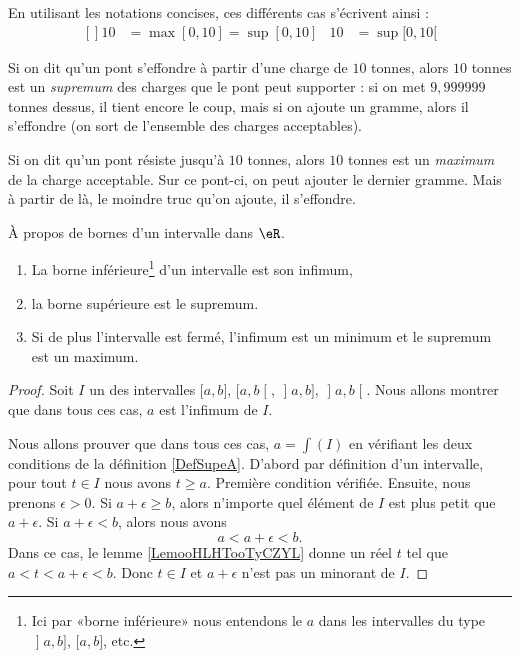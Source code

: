 En utilisant les notations concises, ces différents cas s'écrivent ainsi :
\begin{equation}
	\begin{aligned}[]
		10 & =\max[0,10]=\sup[0,10] & 10 & =\sup[0,10[
	\end{aligned}
\end{equation}


\begin{example}
	Si on dit qu'un pont s'effondre à partir d'une charge de \( 10\) tonnes, alors \( 10\) tonnes est un \emph{supremum} des charges que le pont peut supporter : si on met \( 9,999999\) tonnes dessus, il tient encore le coup, mais si on ajoute un gramme, alors il s'effondre (on sort de l'ensemble des charges acceptables).
\end{example}

\begin{example}
	Si on dit qu'un pont résiste jusqu'à \( 10\) tonnes, alors \( 10\) tonnes est un \emph{maximum} de la charge acceptable. Sur ce pont-ci, on peut ajouter le dernier gramme. Mais à partir de là, le moindre truc qu'on ajoute, il s'effondre.
\end{example}

\begin{lemma}       \label{LEMooWCUXooFqTwDK}
	À propos de bornes d'un intervalle dans \( \eR\).
	\begin{enumerate}
		\item
		      La borne inférieure\footnote{Ici par «borne inférieure» nous entendons le \( a\) dans les intervalles du type \( \mathopen] a , b \mathclose] \), \( \mathopen[ a , b \mathclose]\), etc.} d'un intervalle est son infimum,
		\item
		      la borne supérieure est le supremum.
		\item
		      Si de plus l'intervalle est fermé, l'infimum est un minimum et le supremum est un maximum.
	\end{enumerate}
\end{lemma}

\begin{proof}
	Soit \( I\) un des intervalles \( \mathopen[ a , b \mathclose]\), \( \mathopen[ a , b \mathclose[\), \( \mathopen] a , b \mathclose]\), \( \mathopen] a , b \mathclose[\). Nous allons montrer que dans tous ces cas, \( a\) est l'infimum de \( I\).

	Nous allons prouver que dans tous ces cas, \( a=\int(I)\) en vérifiant les deux conditions de la définition \ref{DefSupeA}. D'abord par définition d'un intervalle, pour tout \( t\in I\) nous avons \( t\geq a\). Première condition vérifiée. Ensuite, nous prenons \( \epsilon>0\). Si \( a+\epsilon\geq b\), alors n'importe quel élément de \( I\) est plus petit que \( a+\epsilon\). Si \( a+\epsilon<b\), alors nous avons
	\begin{equation}
		a<a+\epsilon<b.
	\end{equation}
	Dans ce cas, le lemme \ref{LemooHLHTooTyCZYL} donne un réel \( t\) tel que \( a<t<a+\epsilon<b\). Donc \( t\in I\) et \( a+\epsilon\) n'est pas un minorant de \( I\).
\end{proof}


